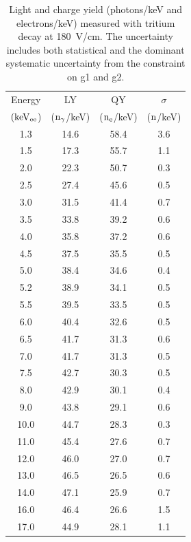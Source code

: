 \begin{table}[h!]
\centering
\begin{tabular}{|c|c|c|c|} \hline
Energy 	& 		LY	& 	QY	& $\sigma$ \\ 
$\rm (keV_{ee}$) & ($\rm n_\gamma$/keV)   & ($\rm n_e$/keV) & ($\rm n$/keV) \\ \hline
1.3 	 & 14.6 	 & 58.4 	 & 3.6 	 \\ \hline 
1.5 	 & 17.3 	 & 55.7 	 & 1.1 	 \\ \hline 
2.0 	 & 22.3 	 & 50.7 	 & 0.3 	 \\ \hline 
2.5 	 & 27.4 	 & 45.6 	 & 0.5 	 \\ \hline 
3.0 	 & 31.5 	 & 41.4 	 & 0.7 	 \\ \hline 
3.5 	 & 33.8 	 & 39.2 	 & 0.6 	 \\ \hline 
4.0 	 & 35.8 	 & 37.2 	 & 0.6 	 \\ \hline 
4.5 	 & 37.5 	 & 35.5 	 & 0.5 	 \\ \hline 
5.0 	 & 38.4 	 & 34.6 	 & 0.4 	 \\ \hline 
5.2 	 & 38.9 	 & 34.1 	 & 0.5 	 \\ \hline 
5.5 	 & 39.5 	 & 33.5 	 & 0.5 	 \\ \hline 
6.0 	 & 40.4 	 & 32.6 	 & 0.5 	 \\ \hline 
6.5 	 & 41.7 	 & 31.3 	 & 0.6 	 \\ \hline 
7.0 	 & 41.7 	 & 31.3 	 & 0.5 	 \\ \hline 
7.5 	 & 42.7 	 & 30.3 	 & 0.5 	 \\ \hline 
8.0 	 & 42.9 	 & 30.1 	 & 0.4 	 \\ \hline 
9.0 	 & 43.8 	 & 29.1 	 & 0.6 	 \\ \hline 
10.0 	 & 44.7 	 & 28.3 	 & 0.3 	 \\ \hline 
11.0 	 & 45.4 	 & 27.6 	 & 0.7 	 \\ \hline 
12.0 	 & 46.0 	 & 27.0 	 & 0.7 	 \\ \hline 
13.0 	 & 46.5 	 & 26.5 	 & 0.6 	 \\ \hline 
14.0 	 & 47.1 	 & 25.9 	 & 0.7 	 \\ \hline 
16.0 	 & 46.4 	 & 26.6 	 & 1.5 	 \\ \hline 
17.0 	 & 44.9 	 & 28.1 	 & 1.1 	 \\ \hline 
\end{tabular}
\caption{Light and charge yield (photons/keV and electrons/keV) measured with tritium decay at 180~V/cm. The uncertainty includes both statistical and the dominant systematic uncertainty from the constraint on g1 and g2.}
\label{table:Yields}
\end{table}

